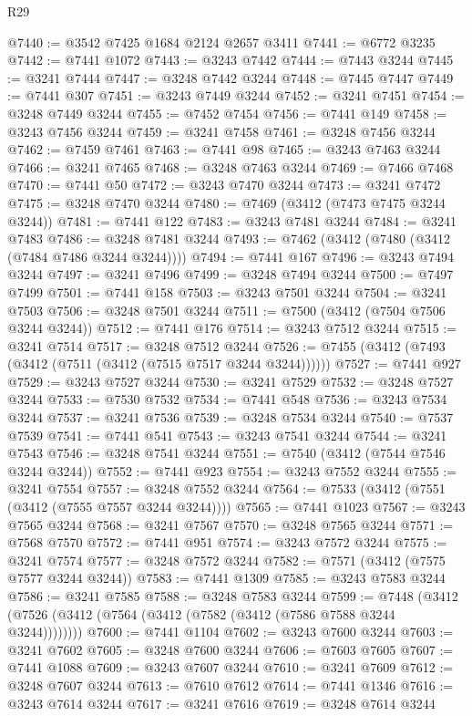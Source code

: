 \begin{lexlean}{R29}
\begin{coremodule}
@7440 := @3542 @7425 @1684 @2124 @2657 @3411
@7441 := @6772 @3235
@7442 := @7441 @1072
@7443 := @3243 @7442
@7444 := @7443 @3244
@7445 := @3241 @7444
@7447 := @3248 @7442 @3244
@7448 := @7445 @7447
@7449 := @7441 @307
@7451 := @3243 @7449 @3244
@7452 := @3241 @7451
@7454 := @3248 @7449 @3244
@7455 := @7452 @7454
@7456 := @7441 @149
@7458 := @3243 @7456 @3244
@7459 := @3241 @7458
@7461 := @3248 @7456 @3244
@7462 := @7459 @7461
@7463 := @7441 @98
@7465 := @3243 @7463 @3244
@7466 := @3241 @7465
@7468 := @3248 @7463 @3244
@7469 := @7466 @7468
@7470 := @7441 @50
@7472 := @3243 @7470 @3244
@7473 := @3241 @7472
@7475 := @3248 @7470 @3244
@7480 := @7469 (@3412 (@7473 @7475 @3244 @3244))
@7481 := @7441 @122
@7483 := @3243 @7481 @3244
@7484 := @3241 @7483
@7486 := @3248 @7481 @3244
@7493 := @7462 (@3412 (@7480 (@3412 (@7484 @7486 @3244 @3244))))
@7494 := @7441 @167
@7496 := @3243 @7494 @3244
@7497 := @3241 @7496
@7499 := @3248 @7494 @3244
@7500 := @7497 @7499
@7501 := @7441 @158
@7503 := @3243 @7501 @3244
@7504 := @3241 @7503
@7506 := @3248 @7501 @3244
@7511 := @7500 (@3412 (@7504 @7506 @3244 @3244))
@7512 := @7441 @176
@7514 := @3243 @7512 @3244
@7515 := @3241 @7514
@7517 := @3248 @7512 @3244
@7526 := @7455 (@3412 (@7493 (@3412 (@7511 (@3412 (@7515 @7517 @3244 @3244))))))
@7527 := @7441 @927
@7529 := @3243 @7527 @3244
@7530 := @3241 @7529
@7532 := @3248 @7527 @3244
@7533 := @7530 @7532
@7534 := @7441 @548
@7536 := @3243 @7534 @3244
@7537 := @3241 @7536
@7539 := @3248 @7534 @3244
@7540 := @7537 @7539
@7541 := @7441 @541
@7543 := @3243 @7541 @3244
@7544 := @3241 @7543
@7546 := @3248 @7541 @3244
@7551 := @7540 (@3412 (@7544 @7546 @3244 @3244))
@7552 := @7441 @923
@7554 := @3243 @7552 @3244
@7555 := @3241 @7554
@7557 := @3248 @7552 @3244
@7564 := @7533 (@3412 (@7551 (@3412 (@7555 @7557 @3244 @3244))))
@7565 := @7441 @1023
@7567 := @3243 @7565 @3244
@7568 := @3241 @7567
@7570 := @3248 @7565 @3244
@7571 := @7568 @7570
@7572 := @7441 @951
@7574 := @3243 @7572 @3244
@7575 := @3241 @7574
@7577 := @3248 @7572 @3244
@7582 := @7571 (@3412 (@7575 @7577 @3244 @3244))
@7583 := @7441 @1309
@7585 := @3243 @7583 @3244
@7586 := @3241 @7585
@7588 := @3248 @7583 @3244
@7599 := @7448 (@3412 (@7526 (@3412 (@7564 (@3412 (@7582 (@3412 (@7586 @7588 @3244 @3244))))))))
@7600 := @7441 @1104
@7602 := @3243 @7600 @3244
@7603 := @3241 @7602
@7605 := @3248 @7600 @3244
@7606 := @7603 @7605
@7607 := @7441 @1088
@7609 := @3243 @7607 @3244
@7610 := @3241 @7609
@7612 := @3248 @7607 @3244
@7613 := @7610 @7612
@7614 := @7441 @1346
@7616 := @3243 @7614 @3244
@7617 := @3241 @7616
@7619 := @3248 @7614 @3244

\end{coremodule}
\end{lexlean}
